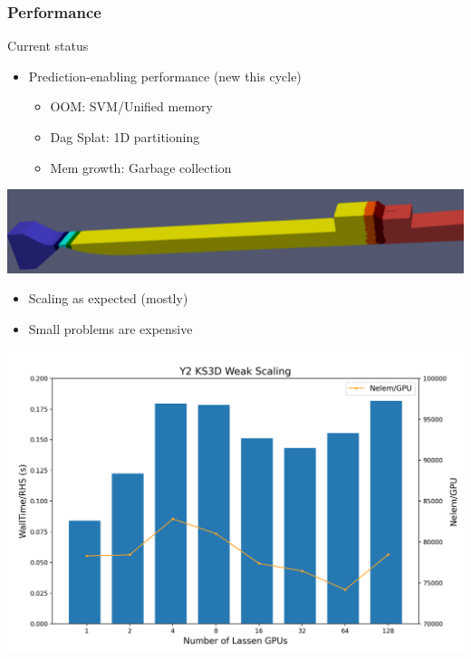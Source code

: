 \begin{frame}\frametitle{Performance}
\begin{center}
Current status
\end{center}
\begin{multicols}{2}
\begin{itemize}
\item Prediction-enabling performance (new this cycle)
\begin{itemize}
\item OOM: SVM/Unified memory
\item Dag Splat: 1D partitioning
\item Mem growth: Garbage collection
\end{itemize}
\end{itemize}
\includegraphics[width=.48\textwidth]{figures/1dpart_bal.png}
\columnbreak
\begin{itemize}
\item Scaling as expected (mostly)
\item Small problems are expensive
\end{itemize}
\includegraphics[width=.48\textwidth]{figures/y2ks3d_weak.png}
\end{multicols}
\end{frame}

